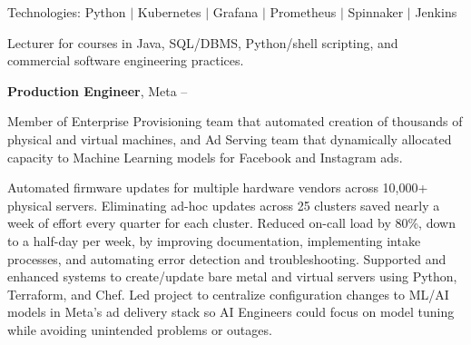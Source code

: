 \documentclass[MMMMyyyy,nonstopmode]{simpleresumecv_stacked}
\newcommand{\tech}[1]{\Gap\textrm{Technologies:} #1}
\newif\ifLOCATION
\begin{document}
\begin{Body}
\begin{Detail}

\end{Detail}

\tech{Python $|$ Kubernetes $|$ Grafana $|$ Prometheus $|$ Spinnaker $|$ Jenkins}

\BigGap

\iffalse %
\Entry
\textbf{Adjunct Professor}, Rochester Institute of Technology \textit{(Part-Time)}
\hfill
\DatestampY{2017} --
Present

\ifLOCATION
\hfill 
Rochester, New York
\fi

\Gap
\begin{Detail}
Lecturer for courses in Java, SQL/DBMS, Python/shell scripting, and commercial software engineering practices.
\end{Detail}

\BigGap
\fi

\Entry
\textbf{Production Engineer}, Meta
\hfill
{} -- 


\Gap
\begin{Detail}
Member of Enterprise Provisioning team that automated creation of thousands of physical and virtual machines,
and Ad Serving team that dynamically allocated capacity to Machine Learning models for Facebook and Instagram ads.

\Gap

\BulletItem
	Automated firmware updates for multiple hardware vendors across 10,000+ physical servers. Eliminating ad-hoc updates across 25 clusters saved nearly a week of effort every quarter for each cluster.
\BulletItem
	Reduced on-call load by 80\%, down to a half-day per week, by improving documentation, implementing intake processes, and automating error detection and troubleshooting.
\BulletItem
	Supported and enhanced systems to create/update bare metal and virtual servers using Python, Terraform, and Chef.
\BulletItem
	Led project to centralize configuration changes to ML/AI models in Meta’s ad delivery stack so AI Engineers could focus on model tuning while avoiding unintended problems or outages.


\end{Detail}
\end{Body}
\end{document}
